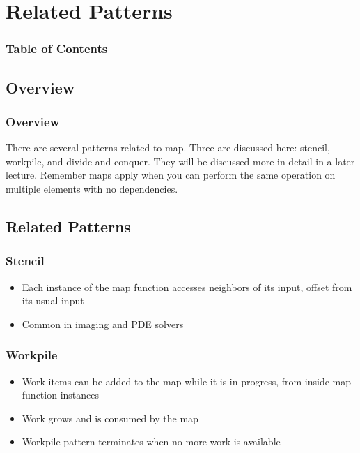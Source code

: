 \documentclass[xcolor=dvipsnames]{beamer}
\begin{document}
\section{Related Patterns} 

	\begin{frame} \frametitle{Table of Contents}
		\tableofcontents[currentsection]
	\end{frame} 
	
	\subsection*{Overview}
        \begin{frame} \frametitle{Overview}
            There are several patterns related to map. Three are discussed here:
            stencil, workpile, and divide-and-conquer. They will be discussed 
            more in detail in a later lecture. Remember maps apply when you can 
            perform the same operation on multiple elements with no dependencies.
        \end{frame}
	
	\subsection*{Related Patterns}
        \begin{frame} \frametitle{Stencil}
            \begin{itemize}
                \item Each instance of the map function accesses neighbors of 
                its input, offset from its usual input
                \item Common in imaging and PDE solvers
            \end{itemize}
        \end{frame}
        
		\begin{frame} \frametitle{Workpile}
			\begin{itemize}
				\item Work items can be added to the map while it is in 
                progress, from inside map function instances
				\item Work grows and is consumed by the map
				\item Workpile pattern terminates when no more work is
                available 
			\end{itemize}
	
		\end{frame}
		
\end{document}
